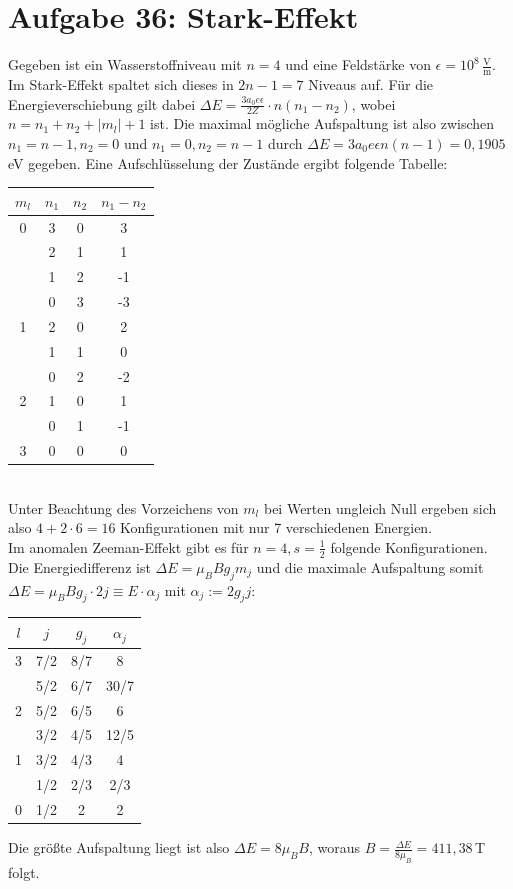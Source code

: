\documentclass[a4paper,12pt]{article}
\newcommand{\tecxt}{}
\begin{document}
\section*{Aufgabe 36: Stark-Effekt}
Gegeben ist ein Wasserstoffniveau mit $n=4$ und eine Feldstärke von $\epsilon=10^8\,\frac{\tecxt\text{V}}{\tecxt\text{m}}$. Im Stark-Effekt spaltet sich dieses in $2n-1=7$ Niveaus auf. Für die Energieverschiebung gilt dabei $\Delta E=\frac{3a_0e\epsilon}{2Z}\cdot n(n_1-n_2)$, wobei $n=n_1+n_2+|m_l|+1$ ist. Die maximal mögliche Aufspaltung ist also zwischen $n_1=n-1,n_2=0$ und $n_1=0,n_2=n-1$ durch $\Delta E=3a_0e\epsilon n(n-1)=0,1905\,$eV gegeben. Eine Aufschlüsselung der Zustände ergibt folgende Tabelle:
\begin{table}[!h]
\centering
\begin{tabular}{c|c|c|c}
$m_l$&$n_1$&$n_2$&$n_1-n_2$\\ \hline
0&3&0&3\\
 &2&1&1\\
 &1&2&-1\\
 &0&3&-3\\ \hline
1&2&0&2\\
 &1&1&0\\
 &0&2&-2\\ \hline
2&1&0&1\\
 &0&1&-1\\ \hline
3&0&0&0
\end{tabular}
\end{table}\\
Unter Beachtung des Vorzeichens von $m_l$ bei Werten ungleich Null ergeben sich also $4+2\cdot 6=16$ Konfigurationen mit nur 7 verschiedenen Energien. \\
Im anomalen Zeeman-Effekt gibt es für $n=4,s=\frac{1}{2}$ folgende Konfigurationen. Die Energiedifferenz ist $\Delta E=\mu_BBg_jm_j$ und die maximale Aufspaltung somit $\Delta E=\mu_BBg_j\cdot 2j\equiv E\cdot\alpha_j$ mit $\alpha_j:=2g_jj$:
\begin{table}[!h]
\centering
\begin{tabular}{c|c|c|c}
$l$&$j$&$g_j$&$\alpha_j$\\ \hline
3&7/2&8/7&8\\
 &5/2&6/7&30/7\\ \hline
2&5/2&6/5&6\\
 &3/2&4/5&12/5\\ \hline
1&3/2&4/3&4\\
 &1/2&2/3&2/3\\ \hline
0&1/2&2&2
\end{tabular}
\end{table}
Die größte Aufspaltung liegt ist also $\Delta E=8\mu_BB$, woraus $B=\frac{\Delta E}{8\mu_B}=411,38\,$T folgt.
\end{document}
